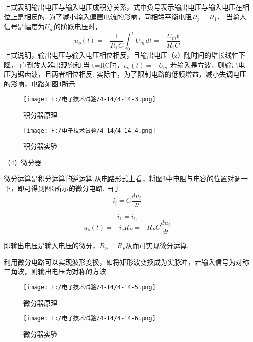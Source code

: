 \documentclass{article}
\begin{document}
            
上式表明输出电压与输入电压成积分关系，式中负号表示输出电压与输入电压在相位上是相反的.
为了减小输入偏置电流的影响，同相端平衡电阻$R_p=R_1$．
当输人信号是幅度为$U_m$的阶跃电压时，
\begin{equation*}
    \  u_o(t)=-\frac{1}{R_1C}\int_{0}^{t} U_m\, dt=-\frac{U_mt}{R_1C} 
  \end{equation*}
上式说明，输出电压与输入电压相位相反，且输出电压（z）随时间的增长线性下降，
直到放大器出现饱和.当 t=RC时，$u_o(t)=-U_m$
若输入是方波，则输出电压为锯齿波，且两者相位相反.
实际中，为了限制电路的低频增益，减小失调电压的影响，电路如图4所示
\begin{figure}[h]
	\begin{minipage}[t]{0.5\linewidth} %
	  \centering   
	  \texttt{[image: H:/电子技术试验/4-14/4-14-3.png]}   
	  \caption{积分器原理}   
	  \label{fig:side:a}   
	\end{minipage}%
	\begin{minipage}[t]{0.5\linewidth}   
	  \centering   
	  \texttt{[image: H:/电子技术试验/4-14/4-14-4.png]}   
	  \caption{积分器实验}   
	  \label{fig:side:b}   
	\end{minipage}   
  \end{figure}
  \par 
  （4）微分器\par 
  微分运算是积分运算的逆运算.从电路形式上看，将图3中电阻与电容的位置对调一下，即可得到图5所示的微分电路.
 由于
 \begin{equation*}
    \  i_i=C\frac{du_i}{dt} 
  \end{equation*}

  \begin{equation*}
    \  i_1=i_C 
  \end{equation*}
  \begin{equation*}
    \  u_o(t)=-i_cR_F=-R_FC \frac{du_i}{dt}
  \end{equation*}

  即输出电压是输入电压的微分，$R_P=R_F$从而可实现微分运算.
 
利用微分电路可以实现波形变换，如将矩形波变换成为尖脉冲，若输入信号为对称三角波，则输出电压为对称的方波.
  
  
  \begin{figure}[h]
	\begin{minipage}[t]{0.5\linewidth} %
	  \centering   
	  \texttt{[image: H:/电子技术试验/4-14/4-14-5.png]}   
	  \caption{微分器原理}   
	  \label{fig:side:a}   
	\end{minipage}%
	\begin{minipage}[t]{0.5\linewidth}   
	  \centering   
	  \texttt{[image: H:/电子技术试验/4-14/4-14-6.png]}   
	  \caption{微分器实验}   
	  \label{fig:side:b}   
	\end{minipage}   
  \end{figure}
\end{document}
